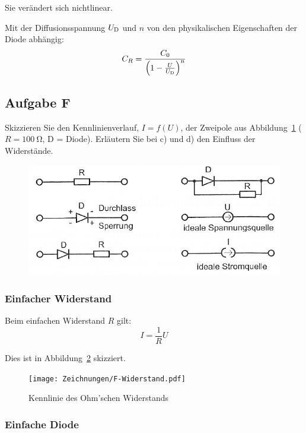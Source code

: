 Sie verändert sich nichtlinear. \cite[§15.2.2]{beuth/elementare_elektronik}

Mit der Diffusionsspannung $U_\text D$ und $n$ von den physikalischen
Eigenschaften der Diode abhängig:
\cite[§1.1.1.1.2]{antula/schaltungen_mikroelektronik}
\[
	C_R = \frac{C_0}{\del{1- \frac U{U_\text D}}^n}
\]

\FloatBarrier
\subsection{Aufgabe F}

\begin{problem}
	Skizzieren Sie den Kennlinienverlauf, $I = f(U)$, der Zweipole aus
	Abbildung~\ref{fig:2-3} ($R = \SI{100}\ohm$, D = Diode). Erläutern Sie bei
	c) und d) den Einfluss der Widerstände.
\end{problem}

\begin{figure}[htbp]
	\centering
	\includegraphics[width=.6\linewidth]{Bilder_aus_Anleitung/2-3.png}
	\caption{%
		\cite[Abbildung~2.3]{physik313-Anleitung}
	}
	\label{fig:2-3}
\end{figure}

\FloatBarrier
\subsubsection{Einfacher Widerstand}

Beim einfachen Widerstand $R$ gilt:
\[
	I = \frac 1R U
\]

Dies ist in Abbildung~\ref{fig:F-Widerstand} skizziert.

\begin{figure}[htbp]
	\centering
	\texttt{[image: Zeichnungen/F-Widerstand.pdf]}
	\caption{%
		Kennlinie des Ohm'schen Widerstands
	}
	\label{fig:F-Widerstand}
\end{figure}

\FloatBarrier
\subsubsection{Einfache Diode}

